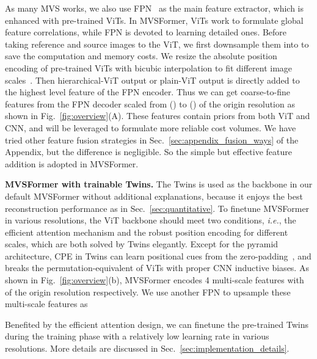 \documentclass[10pt]{article} \usepackage[preprint]{tmlr}
\begin{document}
As many MVS works, we also use FPN~\citep{lin2017feature} as the main feature extractor, which is enhanced with pre-trained ViTs. 
In MVSFormer, ViTs work to formulate global feature correlations, while FPN is devoted to learning detailed ones. 
Before taking reference and source images to the ViT, we first downsample them into  to save the computation and memory costs. We resize the absolute position encoding of pre-trained ViTs with bicubic interpolation to fit different image scales~\citep{dosovitskiy2020image}.
Then hierarchical-ViT output  or plain-ViT output  is directly added to the highest level feature of the FPN encoder.
Thus we can get coarse-to-fine features  from the FPN decoder scaled from () to () of the origin resolution as shown in Fig.~\ref{fig:overview}(A). These features contain priors from both ViT and CNN, and will be leveraged to formulate more reliable cost volumes.
We have tried other feature fusion strategies in Sec.~\ref{sec:appendix_fusion_ways} of the Appendix, but the difference is negligible. So the simple but effective feature addition is adopted in MVSFormer.

\noindent\textbf{MVSFormer with trainable Twins.}
The Twins is used as the backbone in our default MVSFormer without additional explanations, because it enjoys the best reconstruction performance as in Sec.~\ref{sec:quantitative}.
To finetune MVSFormer in various resolutions, the ViT backbone should meet two conditions, \emph{i.e.}, the efficient attention mechanism and the robust position encoding for different scales, which are both solved by Twins elegantly. Except for the pyramid architecture, CPE in Twins can learn positional cues from the zero-padding~\citep{islam2020much}, and breaks the permutation-equivalent of ViTs with proper CNN inductive biases.
As shown in Fig.~\ref{fig:overview}(b), MVSFormer encodes 4 multi-scale features  with  of the origin resolution respectively. We use another FPN to upsample these multi-scale features as

Benefited by the efficient attention design, we can finetune the pre-trained Twins during the training phase with a relatively low learning rate in various resolutions. More details are discussed in Sec.~\ref{sec:implementation_details}.
\end{document}
